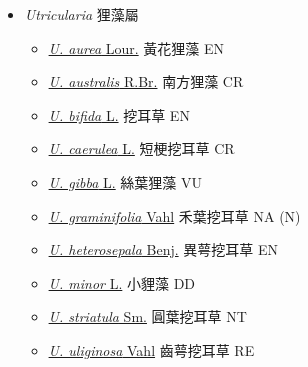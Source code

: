 
  \begin{itemize}
 \item[] \textit{Utricularia} 狸藻屬
                                
  \begin{itemize}
        \item[] \href{http://www.theplantlist.org/tpl1.1/search?q=Utricularia+aurea}{\textit{U. aurea} Lour.}   黃花狸藻   EN
        \item[] \href{http://www.theplantlist.org/tpl1.1/search?q=Utricularia+australis}{\textit{U. australis} R.Br.}   南方狸藻   CR
        \item[] \href{http://www.theplantlist.org/tpl1.1/search?q=Utricularia+bifida}{\textit{U. bifida} L.}   挖耳草   EN
        \item[] \href{http://www.theplantlist.org/tpl1.1/search?q=Utricularia+caerulea}{\textit{U. caerulea} L.}   短梗挖耳草   CR
        \item[] \href{http://www.theplantlist.org/tpl1.1/search?q=Utricularia+gibba}{\textit{U. gibba} L.}   絲葉狸藻   VU
        \item[] \href{http://www.theplantlist.org/tpl1.1/search?q=Utricularia+graminifolia}{\textit{U. graminifolia} Vahl}   禾葉挖耳草   NA (N)
        \item[] \href{http://www.theplantlist.org/tpl1.1/search?q=Utricularia+heterosepala}{\textit{U. heterosepala} Benj.}   異萼挖耳草   EN
        \item[] \href{http://www.theplantlist.org/tpl1.1/search?q=Utricularia+minor}{\textit{U. minor} L.}   小貍藻   DD
        \item[] \href{http://www.theplantlist.org/tpl1.1/search?q=Utricularia+striatula}{\textit{U. striatula} Sm.}   圓葉挖耳草   NT
        \item[] \href{http://www.theplantlist.org/tpl1.1/search?q=Utricularia+uliginosa}{\textit{U. uliginosa} Vahl}   齒萼挖耳草   RE
  \end{itemize}
  \end{itemize}
